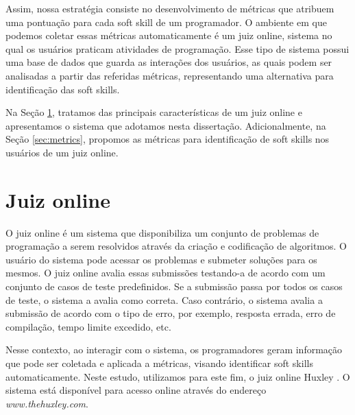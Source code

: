Assim, nossa estratégia consiste no desenvolvimento de métricas que atribuem uma pontuação para cada soft skill de um programador. O ambiente em que podemos coletar essas métricas automaticamente é um juiz online, sistema no qual os usuários praticam atividades de programação. Esse tipo de sistema possui uma base de dados que guarda as interações dos usuários, as quais podem ser analisadas a partir das referidas métricas, representando uma alternativa para identificação das soft skills.



Na Seção \ref{sec:huxley}, tratamos das principais características de um juiz online e apresentamos o sistema que adotamos nesta dissertação. Adicionalmente, na Seção \ref{sec:metrics}, propomos as métricas para identificação de soft skills nos usuários de um juiz online.

\section{Juiz online} 
\label{sec:huxley}

O juiz online é um sistema que disponibiliza um conjunto de problemas de programação a serem resolvidos através da criação e codificação de algoritmos. O usuário do sistema pode acessar os problemas e submeter soluções para os mesmos. O juiz online avalia essas submissões testando-a de acordo com um conjunto de casos de teste predefinidos. Se a submissão passa por todos os casos de teste, o sistema a avalia como correta. Caso contrário, o sistema avalia a submissão de acordo com o tipo de erro, por exemplo, resposta errada, erro de compilação, tempo limite excedido, etc.

Nesse contexto, ao interagir com o sistema, os programadores geram informação que pode ser coletada e aplicada a métricas, visando identificar soft skills automaticamente. Neste estudo, utilizamos para este fim, o juiz online Huxley \cite{paes:13}. O sistema está disponível para acesso online através do endereço \textit{www.thehuxley.com}.

